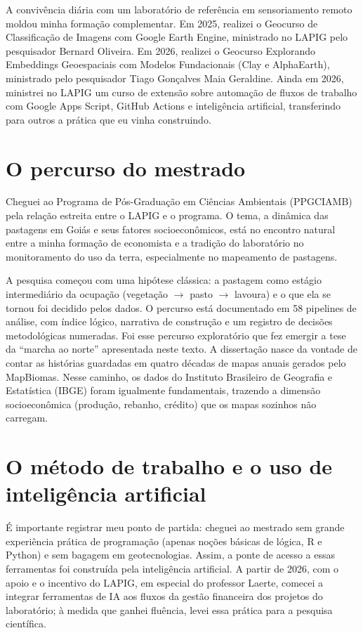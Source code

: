 A convivência diária com um laboratório de referência em sensoriamento remoto
moldou minha formação complementar. Em 2025, realizei o Geocurso de
Classificação de Imagens com Google Earth Engine, ministrado no LAPIG pelo
pesquisador Bernard Oliveira. Em 2026, realizei o Geocurso Explorando
Embeddings Geoespaciais com Modelos Fundacionais (Clay e AlphaEarth),
ministrado pelo pesquisador Tiago Gonçalves Maia Geraldine. Ainda em 2026,
ministrei no LAPIG um curso de extensão sobre automação de fluxos de trabalho
com Google Apps Script, GitHub Actions e inteligência artificial, transferindo
para outros a prática que eu vinha construindo.

\section*{O percurso do mestrado}

Cheguei ao Programa de Pós-Graduação em Ciências Ambientais (PPGCIAMB) pela
relação estreita entre o LAPIG e o programa. O tema, a dinâmica das
pastagens em Goiás e seus fatores socioeconômicos, está no encontro natural
entre a minha formação de economista e a tradição do laboratório no
monitoramento do uso da terra, especialmente no mapeamento de pastagens.

A pesquisa começou com uma hipótese clássica: a pastagem como estágio
intermediário da ocupação (vegetação $\to$ pasto $\to$ lavoura) e o que ela
se tornou foi decidido pelos dados. O percurso está documentado em 58
pipelines de análise, com índice lógico, narrativa de construção e um
registro de decisões metodológicas numeradas. Foi esse percurso exploratório
que fez emergir a tese da ``marcha ao norte'' apresentada neste texto. A
dissertação nasce da vontade de contar as histórias guardadas em quatro décadas de
mapas anuais gerados pelo MapBiomas. Nesse caminho, os dados do Instituto Brasileiro de Geografia e
Estatística (IBGE) foram igualmente fundamentais, trazendo a dimensão
socioeconômica (produção, rebanho, crédito) que os mapas sozinhos não
carregam.

\section*{O método de trabalho e o uso de inteligência artificial}

É importante registrar meu ponto de partida: cheguei ao mestrado sem
grande experiência prática de programação (apenas noções básicas de lógica, R e
Python) e sem bagagem em geotecnologias. Assim, a ponte de acesso a essas ferramentas foi construída pela
inteligência artificial. A partir de 2026, com o apoio e o incentivo do
LAPIG, em especial do professor Laerte, comecei a integrar ferramentas de IA
aos fluxos da gestão financeira dos projetos do laboratório; à medida que
ganhei fluência, levei essa prática para a pesquisa científica.

